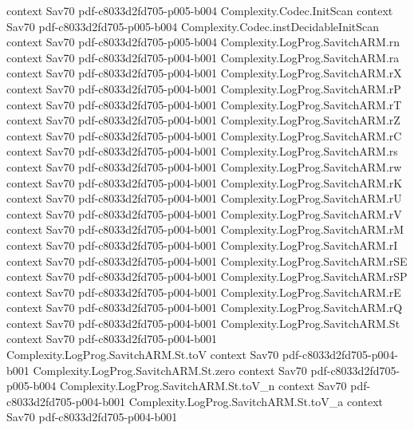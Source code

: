 \begin{theorem}
  {context}
  {Sav70}
  {pdf-c8033d2fd705-p005-b004}
\proofstep
  {Complexity.Codec.InitScan}
  {context}
  {Sav70}
  {pdf-c8033d2fd705-p005-b004}
\proofstep
  {Complexity.Codec.instDecidableInitScan}
  {context}
  {Sav70}
  {pdf-c8033d2fd705-p005-b004}
\proofstep
  {Complexity.LogProg.SavitchARM.rn}
  {context}
  {Sav70}
  {pdf-c8033d2fd705-p004-b001}
\proofstep
  {Complexity.LogProg.SavitchARM.ra}
  {context}
  {Sav70}
  {pdf-c8033d2fd705-p004-b001}
\proofstep
  {Complexity.LogProg.SavitchARM.rX}
  {context}
  {Sav70}
  {pdf-c8033d2fd705-p004-b001}
\proofstep
  {Complexity.LogProg.SavitchARM.rP}
  {context}
  {Sav70}
  {pdf-c8033d2fd705-p004-b001}
\proofstep
  {Complexity.LogProg.SavitchARM.rT}
  {context}
  {Sav70}
  {pdf-c8033d2fd705-p004-b001}
\proofstep
  {Complexity.LogProg.SavitchARM.rZ}
  {context}
  {Sav70}
  {pdf-c8033d2fd705-p004-b001}
\proofstep
  {Complexity.LogProg.SavitchARM.rC}
  {context}
  {Sav70}
  {pdf-c8033d2fd705-p004-b001}
\proofstep
  {Complexity.LogProg.SavitchARM.rs}
  {context}
  {Sav70}
  {pdf-c8033d2fd705-p004-b001}
\proofstep
  {Complexity.LogProg.SavitchARM.rw}
  {context}
  {Sav70}
  {pdf-c8033d2fd705-p004-b001}
\proofstep
  {Complexity.LogProg.SavitchARM.rK}
  {context}
  {Sav70}
  {pdf-c8033d2fd705-p004-b001}
\proofstep
  {Complexity.LogProg.SavitchARM.rU}
  {context}
  {Sav70}
  {pdf-c8033d2fd705-p004-b001}
\proofstep
  {Complexity.LogProg.SavitchARM.rV}
  {context}
  {Sav70}
  {pdf-c8033d2fd705-p004-b001}
\proofstep
  {Complexity.LogProg.SavitchARM.rM}
  {context}
  {Sav70}
  {pdf-c8033d2fd705-p004-b001}
\proofstep
  {Complexity.LogProg.SavitchARM.rI}
  {context}
  {Sav70}
  {pdf-c8033d2fd705-p004-b001}
\proofstep
  {Complexity.LogProg.SavitchARM.rSE}
  {context}
  {Sav70}
  {pdf-c8033d2fd705-p004-b001}
\proofstep
  {Complexity.LogProg.SavitchARM.rSP}
  {context}
  {Sav70}
  {pdf-c8033d2fd705-p004-b001}
\proofstep
  {Complexity.LogProg.SavitchARM.rE}
  {context}
  {Sav70}
  {pdf-c8033d2fd705-p004-b001}
\proofstep
  {Complexity.LogProg.SavitchARM.rQ}
  {context}
  {Sav70}
  {pdf-c8033d2fd705-p004-b001}
\proofstep
  {Complexity.LogProg.SavitchARM.St}
  {context}
  {Sav70}
  {pdf-c8033d2fd705-p004-b001}
\proofstep
  {Complexity.LogProg.SavitchARM.St.toV}
  {context}
  {Sav70}
  {pdf-c8033d2fd705-p004-b001}
\proofstep
  {Complexity.LogProg.SavitchARM.St.zero}
  {context}
  {Sav70}
  {pdf-c8033d2fd705-p005-b004}
\proofstep
  {Complexity.LogProg.SavitchARM.St.toV_n}
  {context}
  {Sav70}
  {pdf-c8033d2fd705-p004-b001}
\proofstep
  {Complexity.LogProg.SavitchARM.St.toV_a}
  {context}
  {Sav70}
  {pdf-c8033d2fd705-p004-b001}

\end{theorem}
